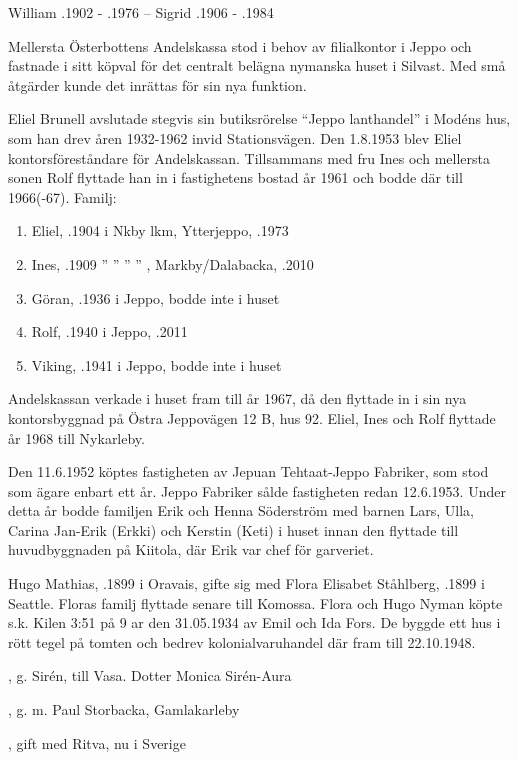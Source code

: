 William .1902 - .1976   --   Sigrid .1906 - .1984



Mellersta Österbottens Andelskassa stod i behov av filialkontor i Jeppo och fastnade i sitt köpval för det centralt belägna nymanska huset i Silvast. Med små åtgärder kunde det inrättas för sin nya funktion.

Eliel Brunell avslutade stegvis sin butiksrörelse ``Jeppo lanthandel'' i 	Modéns hus, som han drev åren 1932-1962 invid Stationsvägen. Den 	1.8.1953 blev Eliel kontorsföreståndare för Andelskassan. Tillsammans med fru Ines och mellersta sonen Rolf flyttade han in i fastighetens bostad år 1961 och bodde där till 1966(-67).
Familj:
\begin{enumerate}
  \item Eliel, .1904 i Nkby lkm, Ytterjeppo, .1973
  \item Ines, .1909 	'' ''   ''    ''   , Markby/Dalabacka, .2010
  \item Göran, .1936 i Jeppo, bodde inte i huset
  \item Rolf, .1940 i Jeppo, .2011
  \item Viking, .1941  i Jeppo, bodde inte i huset
\end{enumerate}
Andelskassan verkade i huset fram till år 1967, då den flyttade in i sin nya kontorsbyggnad på Östra Jeppovägen 12 B, hus 92.
Eliel, Ines och Rolf flyttade år 1968 till Nykarleby.


Den 11.6.1952 köptes fastigheten av Jepuan Tehtaat-Jeppo Fabriker, som stod som ägare enbart ett år. Jeppo Fabriker sålde fastigheten redan 12.6.1953. Under detta år bodde familjen Erik och Henna Söderström med barnen Lars, Ulla, Carina Jan-Erik (Erkki) och Kerstin (Keti) i huset innan den flyttade till huvudbyggnaden på Kiitola, där Erik var chef för garveriet.


Hugo Mathias, .1899 i Oravais, gifte sig med Flora Elisabet Ståhlberg, .1899  i Seattle. Floras familj flyttade senare till Komossa. Flora och Hugo Nyman köpte s.k. Kilen 3:51 på 9 ar den 31.05.1934 av Emil och Ida Fors. De byggde ett hus i rött tegel på tomten och bedrev kolonialvaruhandel där fram till 22.10.1948.
\begin{jhchildren}
  \item {}, g. Sirén, till Vasa. Dotter Monica Sirén-Aura
  \item {}, g. m. Paul Storbacka, Gamlakarleby
  \item {}, gift med Ritva, nu i Sverige
\end{jhchildren}


